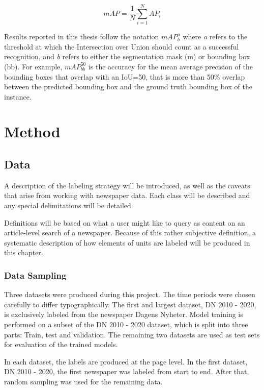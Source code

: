 \documentclass[oneside, english, bibtex]{kththesis}
\begin{document}
\begin{equation}
mAP = \frac{1}{N} \sum_{i=1}^{N} AP_i
    \label{eqn:map}
\end{equation}

Results reported in this thesis follow the notation $mAP^{a}_{b}$ where \textit{a} refers to the threshold at which the Intersection over Union should count as a successful recognition, and \textit{b} refers to either the segmentation mask (m) or bounding box (bb). For example, $mAP^{50}_{bb}$ is the accuracy for the mean average precision of the bounding boxes that overlap with an IoU=50, that is more than 50\% overlap between the predicted bounding box and the ground truth bounding box of the instance.

\chapter{Method}
\label{ch:method}

\section{Data}

A description of the labeling strategy will be introduced, as well as the caveats that arise from working with newspaper data.
Each class will be described and any special delimitations will be detailed.

Definitions will be based on what a user might like to query as content on an article-level search of a newspaper.
Because of this rather subjective definition, a systematic description of how elements of units are labeled will be produced in this chapter.


\subsection{Data Sampling}

Three datasets were produced during this project.
The time periods were chosen carefully to differ typographically.
The first and largest dataset, DN 2010 - 2020,
is exclusively labeled from the newspaper Dagens Nyheter.
Model training is performed on a subset of the DN 2010 - 2020 dataset,
which is split into three parts: Train, test and validation.
The remaining two datasets are used as test sets for evaluation of the trained models.

In each dataset, the labels are produced at the page level.
In the first dataset, DN 2010 - 2020, the first newspaper was labeled from start to end.
After that, random sampling was used for the remaining data.
\end{document}
